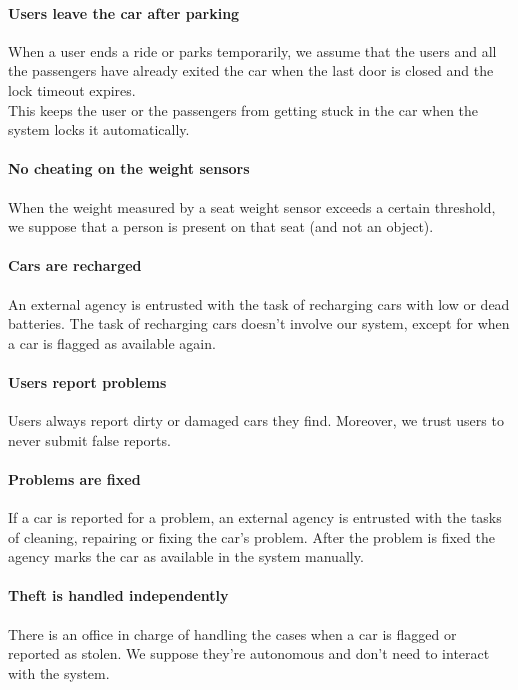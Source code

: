 \documentclass[english]{article}
\begin{document}
\paragraph{Users leave the car after parking}
When a user ends a ride or parks temporarily, we assume that the users and all the passengers have already exited the car when the last door is closed and the lock timeout expires. \\
This keeps the user or the passengers from getting stuck in the car when the system locks it automatically.

\paragraph{No cheating on the weight sensors}
When the weight measured by a seat weight sensor exceeds a certain threshold, we suppose that a person is present on that seat (and not an object).

\paragraph{Cars are recharged}
An external agency is entrusted with the task of recharging cars with low or dead batteries. The task of recharging cars doesn't involve our system, except for when a car is flagged as available again.

\paragraph{Users report problems}
Users always report dirty or damaged cars they find. Moreover, we trust users to never submit false reports.

\paragraph{Problems are fixed}
If a car is reported for a problem, an external agency is entrusted with the tasks of cleaning, repairing or fixing the car's problem. After the problem is fixed the agency marks the car as available in the system manually.

\paragraph{Theft is handled independently}
There is an office in charge of handling the cases when a car is flagged or reported as stolen.
We suppose they're autonomous and don't need to interact with the system.
\end{document}
